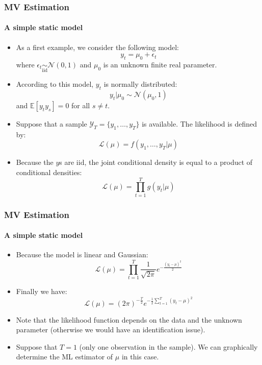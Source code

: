 \documentclass[10pt,slidestop]{beamer}
\newcommand{\normal}[2]{\mathcal N\left(#1,#2\right)}
\newcommand{\AllSample}{ \mathcal Y_T }
\begin{document}
\begin{frame}
  \frametitle{MV Estimation}
  \framesubtitle{A simple static model}
  \begin{itemize}
    \item As a first example, we consider the following model:
      \begin{equation}
        \label{eq:simple-static-model:1}\tag{2-a}
        y_t = \mu_0 + \epsilon_t
      \end{equation}
      where $\epsilon_t\underset{\mathrm{iid}}{\sim}\normal{0}{1}$ and
      $\mu_0$ is an unknown finite real parameter.
      \bigskip
    \item According to this model, $y_t$ is normally distributed:
      \[
      y_t|\mu_0 \sim \normal{\mu_0}{1}
      \]
      and $\mathbb E[y_ty_s] = 0$ for all $s\neq t$.
      \medskip
    \item Suppose that a sample $\AllSample = \{y_1,\dots,y_T\}$ is
      available. The likelihood is defined by:
      \[
      \mathcal L (\mu) = f(y_1,\dots,y_T|\mu)
      \]
      \medskip
    \item Because the $y$s are $\mathrm{iid}$, the joint conditional
      density is equal to a product of conditional densities:
      \[
      \mathcal L (\mu) = \prod_{t=1}^T g(y_t|\mu)
      \]
    \end{itemize}
\end{frame}

\begin{frame}
  \frametitle{MV Estimation}
  \framesubtitle{A simple static model}
  \begin{itemize}
    \item Because the model is linear and Gaussian:
      \[
      \mathcal L (\mu) = \prod_{t=1}^T \frac{1}{\sqrt{2\pi}}e^{-\frac{(y_t-\mu)^2}{2}}
      \]
      \bigskip
    \item Finally we have:
      \begin{equation}
        \label{eq:simple-static-model:2}\tag{2-b}
        \mathcal L (\mu) = (2\pi)^{-\frac{T}{2}}e^{-\frac{1}{2}\sum_{t=1}^T(y_t-\mu)^2}
      \end{equation}
      \bigskip
    \item Note that the likelihood function depends on the data and the unknown parameter (otherwise we would have an identification issue).
      \bigskip
    \item Suppose that $T=1$ (only one observation in the sample). We can
      graphically determine the ML estimator of $\mu$ in this case.
    \end{itemize}
\end{frame}
\end{document}

